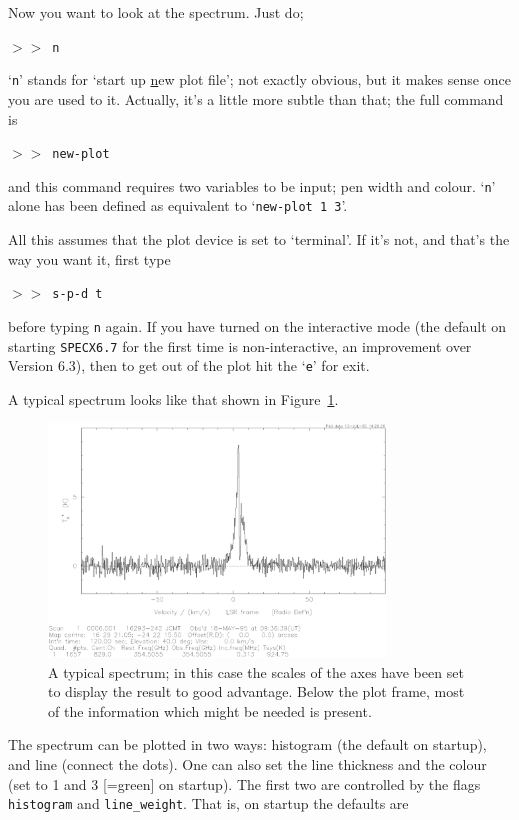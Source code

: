 \documentclass[11pt,twoside]{starlink}
\providecommand{\SPECX}{\texttt{SPECX}}
\providecommand{\SP}{{$>\!>$}}
\begin{document}
Now you want to look at the spectrum.  Just do;

\SP\ \texttt{n}

`{\tt{n}}' stands for `start up \underline{n}ew plot file'; not exactly
obvious, but it makes sense once you are used to it. Actually, it's a
little more subtle than that; the full command is

\SP\ \texttt{new-plot}

and this command requires two variables to be input; pen width and
colour. `{\tt{n}}' alone has been defined as equivalent to
`{\tt{new-plot 1 3}}'.

All this assumes that the plot device is set to `terminal'. If it's not,
and that's the way you want it, first type

\SP\ \texttt{s-p-d t}

before typing \texttt{n} again. If you have turned on the interactive
mode (the default on starting \SPECX \texttt{6.7} for the first time is
non-interactive, an improvement over Version 6.3), then to get out of
the plot hit the `{\tt{e}}' for exit.

A typical spectrum looks like that shown in
Figure~\ref{fig:specx_plot}.
%
\begin{figure}[htb]
\centering
\includegraphics[width=0.8\textwidth]{sc8_spectrum}
\caption[A typical plot]
{\small{A typical spectrum; in this case the scales of the axes have
been set to display the result to good advantage. Below the plot
frame, most of the information which might be needed is present.}  }
\label{fig:specx_plot}
\end{figure}

The spectrum can be plotted in two ways: histogram (the default on
startup), and line (connect the dots). One can also set the line
thickness and the colour (set to 1 and 3 [=green] on startup).
The first two are controlled by the flags
\texttt{histogram} and \texttt{line\_weight}. That is, on startup the
defaults are
\end{document}
